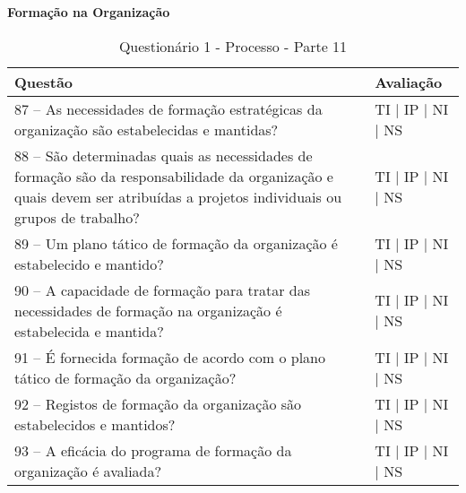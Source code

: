 \documentclass[openany,10pt,a4paper]{article}
\begin{document}
\begin{appendix}
\begin{table}[h]
\textbf{Formação na Organização}
	\centering
	\caption{Questionário 1 - Processo - Parte 11}
	\begin{tabular}{p{3.5in}p{2in}}		
		\toprule
		\textbf{Questão}  & \textbf{Avaliação}\\ 
		\midrule
		87 – As necessidades de formação estratégicas da organização são estabelecidas e mantidas?
 & TI | IP | NI | NS \\
        \midrule
		88 – São determinadas quais as necessidades de formação são da responsabilidade da 
organização e quais devem ser atribuídas a projetos individuais ou grupos de trabalho?
 & TI | IP | NI | NS \\
		\midrule
		89 – Um plano tático de formação da organização é estabelecido e mantido?
 & TI | IP | NI | NS \\
		\midrule
        90 – A capacidade de formação para tratar das necessidades de formação na organização é 
estabelecida e mantida?
 & TI | IP | NI | NS \\
		\midrule
		91 – É fornecida formação de acordo com o plano tático de formação da organização?
  & TI | IP | NI | NS \\
		\midrule
		92 – Registos de formação da organização são estabelecidos e mantidos?
 & TI | IP | NI | NS \\
 \midrule
		93 – A eficácia do programa de formação da organização é avaliada?
 & TI | IP | NI | NS \\
		\bottomrule
	\end{tabular} 
	\label{tab:tabela1}
\end{table}


\end{appendix}
\end{document}

